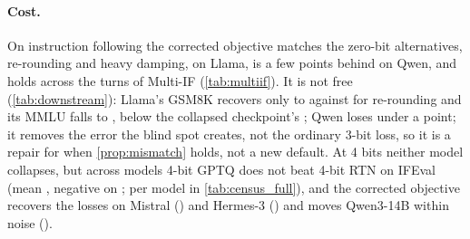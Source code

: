 \paragraph{Cost.}
On instruction following the corrected objective matches the zero-bit alternatives, re-rounding and heavy damping, on Llama, is a few points behind on Qwen, and holds across the turns of Multi-IF (\cref{tab:multiif}).
It is not free (\cref{tab:downstream}): Llama's GSM8K recovers only to \LcorrGSM{} against \LzeroBitGSM{} for re-rounding and its MMLU falls to \LcorrMMLU{}, below the collapsed checkpoint's \LgptqMMLU{}; Qwen loses under a point; it removes the error the blind spot creates, not the ordinary 3-bit loss, so it is a repair for when \cref{prop:mismatch} holds, not a new default.
At 4 bits neither model collapses, but across \nFour{} models 4-bit GPTQ does not beat 4-bit RTN on IFEval (mean \FourMeanDelta{}, negative on \FourNegFrac{}; per model in \cref{tab:census_full}), and the corrected objective recovers the losses on Mistral (\CorrFourMistral{}) and Hermes-3 (\CorrFourHermes{}) and moves Qwen3-14B within noise (\CorrFourQwenThree{}).

